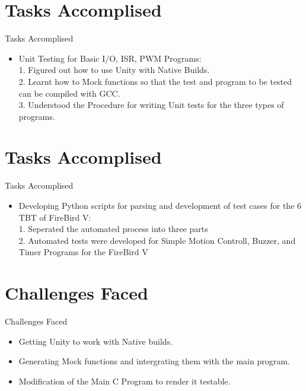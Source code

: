 \documentclass[10pt, a4paper]{beamer}
\begin{document}
\section{Tasks Accomplised}
\begin{frame}{Tasks Accomplised}
	\begin{itemize}
	  \item Unit Testing for Basic I/O, ISR, PWM Programs:\\ 
	  \hspace{.1cm} 1. Figured out how to use Unity with Native Builds. \\
          \hspace{.1cm} 2. Learnt how to  Mock functions so that the test and program to be tested can be compiled with GCC.\\
	  \hspace{.1cm} 3. Understood the Procedure for writing Unit tests for the three types of programs. \\
	\end{itemize}
\end{frame}

\section{Tasks Accomplised}
\begin{frame}{Tasks Accomplised}
	\begin{itemize}
	  \item Developing Python scripts for parsing and development of test cases for the 6 TBT of FireBird V:\\
	  \hspace{.1cm} 1. Seperated the automated process into three parts\\
	  \hspace{.1cm} 2. Automated tests were developed for Simple Motion Controll, Buzzer, and Timer Programs for the FireBird V \\
	\end{itemize}
\end{frame}

\section{Challenges Faced}
\begin{frame}{Challenges Faced}
	\begin{itemize}
		\item Getting Unity to work with Native builds.\\
		\item Generating Mock functions and intergrating them with the main program.\\
		\item Modification of the Main C Program to render it testable.\\
	\end{itemize}
\end{frame}
\end{document}
